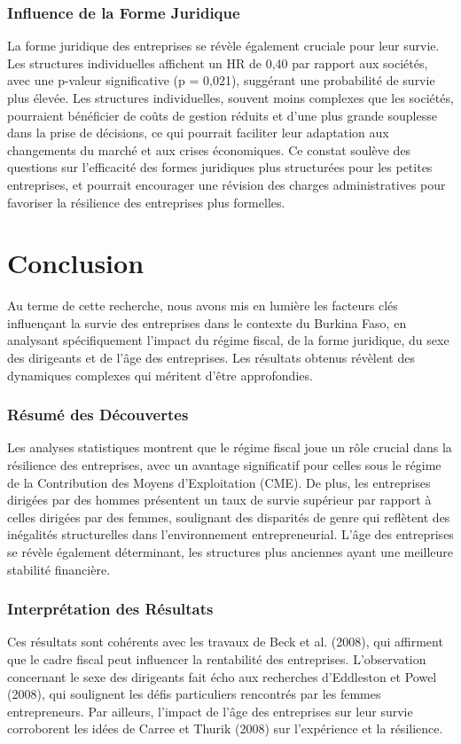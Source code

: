 \documentclass[a4paper,12pt]{report}
\begin{document}
\subsection{Influence de la Forme Juridique}
La forme juridique des entreprises se révèle également cruciale pour leur survie. Les structures individuelles affichent un HR de 0,40 par rapport aux sociétés, avec une p-valeur significative (p = 0,021), suggérant une probabilité de survie plus élevée. Les structures individuelles, souvent moins complexes que les sociétés, pourraient bénéficier de coûts de gestion réduits et d'une plus grande souplesse dans la prise de décisions, ce qui pourrait faciliter leur adaptation aux changements du marché et aux crises économiques. Ce constat soulève des questions sur l’efficacité des formes juridiques plus structurées pour les petites entreprises, et pourrait encourager une révision des charges administratives pour favoriser la résilience des entreprises plus formelles.


\chapter{Conclusion}
Au terme de cette recherche, nous avons mis en lumière les facteurs clés influençant la survie des entreprises dans le contexte du Burkina Faso, en analysant spécifiquement l'impact du régime fiscal, de la forme juridique, du sexe des dirigeants et de l'âge des entreprises. Les résultats obtenus révèlent des dynamiques complexes qui méritent d'être approfondies.

\subsection{Résumé des Découvertes}  
Les analyses statistiques montrent que le régime fiscal joue un rôle crucial dans la résilience des entreprises, avec un avantage significatif pour celles sous le régime de la Contribution des Moyens d’Exploitation (CME). De plus, les entreprises dirigées par des hommes présentent un taux de survie supérieur par rapport à celles dirigées par des femmes, soulignant des disparités de genre qui reflètent des inégalités structurelles dans l'environnement entrepreneurial. L'âge des entreprises se révèle également déterminant, les structures plus anciennes ayant une meilleure stabilité financière.

\subsection{Interprétation des Résultats}  
Ces résultats sont cohérents avec les travaux de Beck et al. (2008), qui affirment que le cadre fiscal peut influencer la rentabilité des entreprises. L'observation concernant le sexe des dirigeants fait écho aux recherches d'Eddleston et Powel (2008), qui soulignent les défis particuliers rencontrés par les femmes entrepreneurs. Par ailleurs, l'impact de l'âge des entreprises sur leur survie corroborent les idées de Carree et Thurik (2008) sur l'expérience et la résilience.
\end{document}
